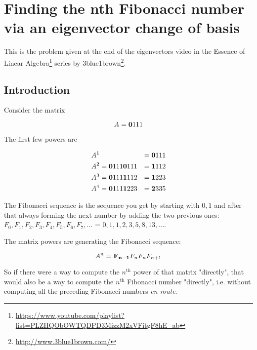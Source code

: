 \section{Finding the nth Fibonacci number via an eigenvector change of basis}

\newcommand{\nth}{n^{\text{th}}}



This is the problem given at the end of the eigenvectors video in the
Essence of Linear Algebra\footnote{\url{https://www.youtube.com/playlist?list=PLZHQObOWTQDPD3MizzM2xVFitgF8hE_ab}}
series by 3blue1brown\footnote{\url{http://www.3blue1brown.com/}}.


\subsection{Introduction}

Consider the matrix

$$
A = \mathbf{0}{1}
        {1}{1}
$$

The first few powers are

\begin{align*}
&A^{1} &= \mathbf{0}{1}
              {1}{1}
\\
&A^{2} = \mathbf{0}{1}
             {1}{1} \mathbf{0}{1}
                        {1}{1} &= \mathbf{1}{1}
                                      {1}{2}
\\
&A^{3} = \mathbf{0}{1}
             {1}{1} \mathbf{1}{1}
                        {1}{2} &= \mathbf{1}{2}
                                      {2}{3}
\\
&A^{4} = \mathbf{0}{1}
             {1}{1} \mathbf{1}{2}
                        {2}{3} &= \mathbf{2}{3}
                                      {3}{5}
\end{align*}

The Fibonacci sequence is the sequence you get by starting with $0,
1$ and after that always forming the next number by adding the two previous ones:
$F_0, F_1, F_2, F_3, F_4, F_5, F_6, F_7, ...$ = $0, 1, 1, 2, 3, 5, 8, 13, ...$.

The matrix powers are generating the Fibonacci sequence:

$$
A^{n} = \mathbf{F_{n-1} }{F_n      }
            {F_n     }{F_{n+1} }
$$

So if there were a way to compute the $\nth$ power of that matrix "directly",
that would also be a way to compute the $\nth$ Fibonacci number "directly",
i.e. without computing all the preceding Fibonacci numbers \textit{en route}.

